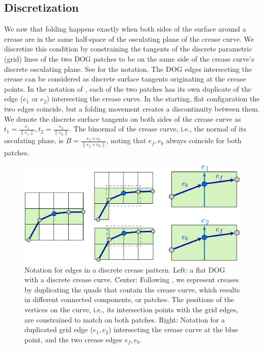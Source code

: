 \subsection{Discretization}
We saw that folding happens exactly when both sides of the surface around a crease are in the same half-space of the osculating plane of the crease curve. We discretize this condition by constraining the tangents of the discrete parametric (grid) lines of the two DOG patches to be on the same side of the crease curve's discrete osculating plane. See  for the notation. The DOG edges intersecting the crease can be considered as discrete surface tangents originating at the crease points. In the notation of , each of the two patches has its own duplicate of the edge ($e_1$ or $e_2$) intersecting the crease curve. In the starting, flat configuration the two edges coincide, but a folding movement creates a discontinuity between them. We denote the discrete surface tangents on both sides of the crease curve as $t_1 = \frac{e_1}{\|e_1\|}, t_2 = \frac{e_2}{\|e_2\|}$. The binormal of the crease curve, i.e., the normal of its osculating plane, is $B = \frac{e_f \times e_b}{\|e_f \times e_b\|}$, noting that $e_f,e_b$ always coincide for both patches.

\begin{figure} [t]
	\centering
	\includegraphics[width=\linewidth]{figures/osc_plane_discretization}
	\caption{Notation for edges in a discrete crease pattern. Left: a flat DOG with a discrete crease curve. Center: Following \cite{rabi2018shape}, we represent creases by duplicating the quads that contain the crease curve, which results in different connected components, or patches. The positions of the vertices on the curve, i.e., its intersection points with the grid edges, are constrained to match on both patches. Right: Notation for a duplicated grid edge ($e_1, e_2$) intersecting the crease curve at the blue point, and the two crease edges $e_f,e_b$. }
	\label{fig:osc_plane_discretization}
\end{figure}

